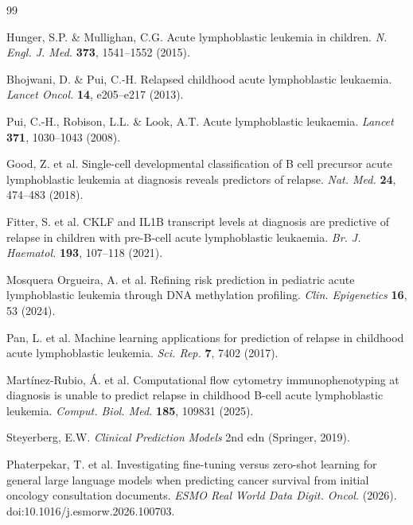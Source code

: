 \documentclass[pdflatex,sn-nature]{sn-jnl}
\begin{document}
\begin{thebibliography}{99}

Hunger, S.P. \& Mullighan, C.G.
Acute lymphoblastic leukemia in children.
\textit{N. Engl. J. Med.} \textbf{373}, 1541--1552 (2015).

Bhojwani, D. \& Pui, C.-H.
Relapsed childhood acute lymphoblastic leukaemia.
\textit{Lancet Oncol.} \textbf{14}, e205--e217 (2013).

Pui, C.-H., Robison, L.L. \& Look, A.T.
Acute lymphoblastic leukaemia.
\textit{Lancet} \textbf{371}, 1030--1043 (2008).

Good, Z. et al.
Single-cell developmental classification of B cell precursor acute
lymphoblastic leukemia at diagnosis reveals predictors of relapse.
\textit{Nat. Med.} \textbf{24}, 474--483 (2018).

Fitter, S. et al.
CKLF and IL1B transcript levels at diagnosis are predictive of
relapse in children with pre-B-cell acute lymphoblastic leukaemia.
\textit{Br. J. Haematol.} \textbf{193}, 107--118 (2021).

Mosquera Orgueira, A. et al.
Refining risk prediction in pediatric acute lymphoblastic leukemia
through DNA methylation profiling.
\textit{Clin. Epigenetics} \textbf{16}, 53 (2024).

Pan, L. et al.
Machine learning applications for prediction of relapse in childhood
acute lymphoblastic leukemia.
\textit{Sci. Rep.} \textbf{7}, 7402 (2017).

Mart\'inez-Rubio, \'{A}. et al.
Computational flow cytometry immunophenotyping at diagnosis is unable
to predict relapse in childhood B-cell acute lymphoblastic leukemia.
\textit{Comput. Biol. Med.} \textbf{185}, 109831 (2025).

Steyerberg, E.W.
\textit{Clinical Prediction Models} 2nd edn (Springer, 2019).

Phaterpekar, T. et al.
Investigating fine-tuning versus zero-shot learning for general large
language models when predicting cancer survival from initial oncology
consultation documents.
\textit{ESMO Real World Data Digit. Oncol.} (2026).
doi:10.1016/j.esmorw.2026.100703.


\end{thebibliography}
\end{document}
